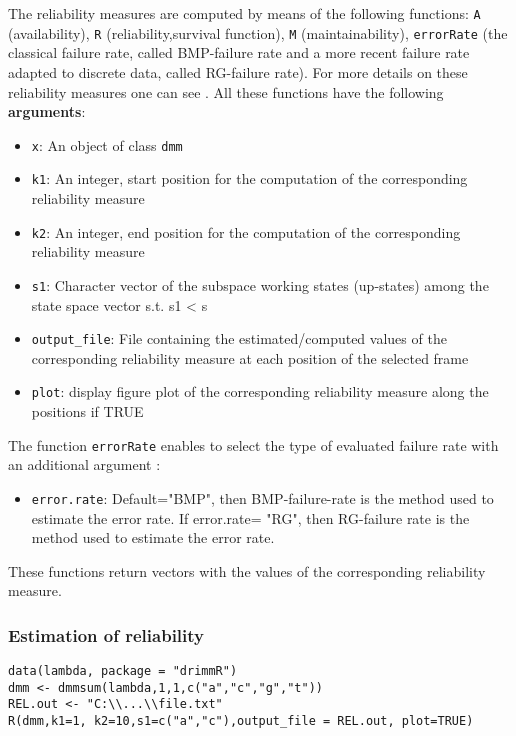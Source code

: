 \documentclass[article,nojss]{jss}\usepackage[]{graphicx}\usepackage[]{color}
\begin{document}
The reliability measures are computed by means of the following functions: {\tt  A} (availability), {\tt  R} (reliability,survival function), {\tt  M} (maintainability), \verb|errorRate| (the classical failure rate, called BMP-failure rate and a more recent failure rate adapted to discrete data, called RG-failure rate). For more details on these reliability measures one can see \cite{Bar2004b,Bar2008b}. All these functions have the following {\bf arguments}:
%
\begin{itemize}
\item {\tt x}: An object of class {\tt dmm}
\item \verb|k1|: An integer, start position for the computation of the corresponding reliability measure
\item \verb|k2|: An integer, end position for the computation of the corresponding reliability measure
\item \verb|s1|: Character vector of the subspace working states (up-states) among the state space vector s.t. s1 < s
\item \verb|output_file|: File containing the estimated/computed values of the corresponding reliability measure at each position of the selected frame
\item \verb|plot|: display figure plot of the corresponding reliability measure along the positions if TRUE
\end{itemize}

The function \verb|errorRate| enables to select the type of evaluated failure rate with an additional argument :

\begin{itemize}
\item \verb|error.rate|: Default="BMP", then BMP-failure-rate is the method used to estimate the error rate. If error.rate= "RG",
then RG-failure rate is the method used to estimate the error rate.
\end{itemize}

These functions return vectors with the values of the corresponding reliability measure.

\clearpage

\subsubsection{Estimation of reliability} \label{subsection_pack_reliab}


\begin{lstlisting}
data(lambda, package = "drimmR")
dmm <- dmmsum(lambda,1,1,c("a","c","g","t"))
REL.out <- "C:\\...\\file.txt"
R(dmm,k1=1, k2=10,s1=c("a","c"),output_file = REL.out, plot=TRUE)
\end{lstlisting}
\end{document}
